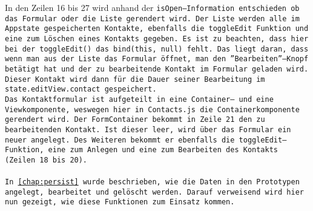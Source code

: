 %
In den Zeilen 16 bis 27 wird anhand der \tt{isOpen}--Information entschieden ob das Formular oder die Liste gerendert wird.
Der Liste werden alle im \gls{App}state gespeicherten Kontakte, ebenfalls die \tt{toggleEdit} Funktion und eine zum Löschen eines Kontakts gegeben.
Es ist zu beachten, dass hier bei der \tt{toggleEdit()} das \tt{bind(this, null)} fehlt. Das liegt daran, dass wenn man aus der Liste das Formular öffnet, man den ''Bearbeiten''--Knopf betätigt hat und der zu bearbeitende Kontakt im Formular geladen wird. Dieser Kontakt wird dann für die Dauer seiner Bearbeitung im \tt{state.editView.contact} gespeichert.\\
%
Das Kontaktformular ist aufgeteilt in eine Container-- und eine Viewkomponente, weswegen hier in \tt{Contacts.js} die Containerkomponente gerendert wird.
Der \tt{FormContainer} bekommt in Zeile 21 den zu bearbeitenden Kontakt.
Ist dieser leer, wird über das Formular ein neuer angelegt.
Des Weiteren bekommt er ebenfalls die \tt{toggleEdit}--Funktion, eine zum Anlegen und eine zum Bearbeiten des Kontakts (Zeilen 18 bis 20).\\\\
%
%
In \autoref{chap:persist} wurde beschrieben, wie die Daten in den Prototypen angelegt, bearbeitet und gelöscht werden. Darauf verweisend wird hier nun gezeigt, wie diese Funktionen zum Einsatz kommen.
